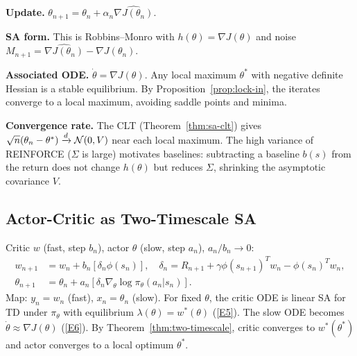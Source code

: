 \documentclass[11pt,a4paper]{article}
\begin{document}
\begin{rlconnection}[title={REINFORCE -- SA on the Gradient ODE}]
\textbf{Update.}
$\theta_{n+1} = \theta_n + \alpha_n\widehat{\nabla J(\theta_n)}$.

\textbf{SA form.} This is Robbins--Monro with
$h(\theta) = \nabla J(\theta)$ and noise
$M_{n+1} = \widehat{\nabla J(\theta_n)} - \nabla J(\theta_n)$.

\textbf{Associated ODE.} $\dot{\theta} = \nabla J(\theta)$. Any
local maximum $\theta^*$ with negative definite Hessian is a stable
equilibrium. By Proposition~\ref{prop:lock-in}, the iterates converge
to a local maximum, avoiding saddle points and minima.

\textbf{Convergence rate.} The CLT (Theorem~\ref{thm:sa-clt}) gives
$\sqrt{n}(\theta_n - \theta^*) \xrightarrow{d} \mathcal{N}(0,V)$ near each
local maximum. The high variance of REINFORCE ($\Sigma$ is large)
motivates baselines: subtracting a baseline $b(s)$ from the return
does not change $h(\theta)$ but reduces $\Sigma$, shrinking the
asymptotic covariance $V$.
\end{rlconnection}

\subsection{Actor-Critic as Two-Timescale SA}

\begin{rlconnection}[title={Actor-Critic -- Two-Timescale Analysis}]
Critic $w$ (fast, step $b_n$), actor $\theta$ (slow, step $a_n$),
$a_n/b_n \to 0$:
\begin{align*}
  w_{n+1} &= w_n + b_n[\delta_n\phi(s_n)], \quad
    \delta_n = R_{n+1} + \gamma\phi(s_{n+1})^Tw_n - \phi(s_n)^Tw_n,\\
  \theta_{n+1} &= \theta_n
    + a_n[\delta_n\nabla_\theta\log\pi_\theta(a_n|s_n)].
\end{align*}
Map: $y_n = w_n$ (fast), $x_n = \theta_n$ (slow). For fixed
$\theta$, the critic ODE is linear SA for TD under $\pi_\theta$ with
equilibrium $\lambda(\theta) = w^*(\theta)$ (\ref{E5}). The slow ODE
becomes $\dot{\theta} \approx \nabla J(\theta)$ (\ref{E6}). By
Theorem~\ref{thm:two-timescale}, critic converges to $w^*(\theta^*)$
and actor converges to a local optimum $\theta^*$.
\end{rlconnection}

\end{document}

